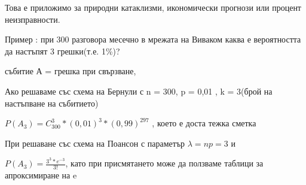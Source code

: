 \documentclass[fleqn,12pt]{article}
\begin{document}
\begin{justify}
Това е приложимо за природни катаклизми, икономически прогнози или процент неизправности.

Пример : при 300 разговора месечно в мрежата на Виваком каква е вероятността да настъпят 3 грешки(т.е. 1\%)?

събитие А = {грешка при свързване}, 

Ако решаваме със схема на Бернули с n = 300, p = 0,01 , k = 3(брой на настъпване на събитието)

$P(A_3) = C_{300}^3 * (0,01) ^ 3 * (0,99)^{297}$ , което е доста тежка сметка

При решаване със схема на Поансон с параметър $\lambda = np = 3$ и 

$P(A_3) = \frac{3^3 * e^{-3}}{3!}$, като при присмятането може да ползваме таблици за апроксимиране на e
\end{justify}
\end{document}
